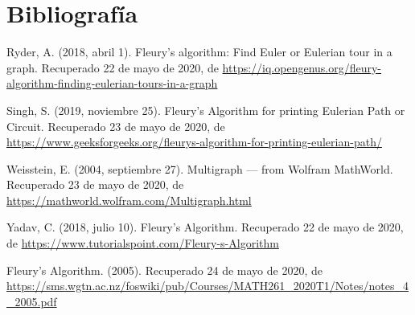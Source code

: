 \chapter*{Bibliografía}

Ryder, A. (2018, abril 1). Fleury’s algorithm: Find Euler or Eulerian tour in a graph. Recuperado 22 de mayo de 2020, de \url{https://iq.opengenus.org/fleury-algorithm-finding-eulerian-tours-in-a-graph}

Singh, S. (2019, noviembre 25). Fleury’s Algorithm for printing Eulerian Path or Circuit. Recuperado 23 de mayo de 2020, de \url{https://www.geeksforgeeks.org/fleurys-algorithm-for-printing-eulerian-path/}

Weisstein, E. (2004, septiembre 27). Multigraph --- from Wolfram MathWorld. Recuperado 23 de mayo de 2020, de \url{https://mathworld.wolfram.com/Multigraph.html}

Yadav, C. (2018, julio 10). Fleury’s Algorithm. Recuperado 22 de mayo de 2020, de \url{https://www.tutorialspoint.com/Fleury-s-Algorithm}

Fleury’s Algorithm. (2005). Recuperado 24 de mayo de 2020, de \url{https://sms.wgtn.ac.nz/foswiki/pub/Courses/MATH261_2020T1/Notes/notes_4_2005.pdf}
